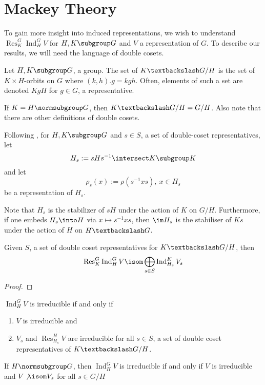 \documentclass[11pt,leqno,oneside]{amsbook}
\newcommand{\Res}{\operatorname{Res}}
\newcommand{\Ind}{\operatorname{Ind}}
\newcommand{\bs}{\textbackslash}
\numberwithin{thm}{section}
\begin{document}
\section{Mackey Theory}
To gain more insight into induced representations, we wish to
understand \(\Res_K^G \Ind_H^G V\) for \(H,K \subgroup G\) and \(V\) a
representation of \(G\). To describe our results, we will need the
language of double cosets.
\begin{defn}
  Let \(H,K \subgroup G\), a group. The set of 
  \(K\bs G /H\) is the set of \(K \times H\)-orbits on
  \(G\) where \((k,h).g = kgh\). Often, elements of such a set are
  denoted \(KgH\) for \(g \in G\), a representative.
\end{defn}
\begin{rmk}
  If \(K=H \normsubgroup G\), then \(K \bs G / H = G/H\). Also note
  that there are other definitions of double cosets.
\end{rmk}
\begin{defn}
  Following \cite{serre}, for \(H,K \subgroup G\) and \(s \in S\), a set
  of double-coset representatives, let \[
    H_s := sHs^{-1} \intersect K \subgroup K
  \]
  and let \[
    \rho_s(x) := \rho(s^{-1}xs), \ x \in H_s
  \]
  be a representation of \(H_s\).
\end{defn}
\begin{rmk}
  Note that \(H_s\) is the stabilizer of \(sH\) under the action of
  \(K\) on \(G/H\). Furthermore, if one embeds \(H_s \into H\) via \(x
  \mapsto s^{-1}xs\), then \(\im H_s\) is the stabiliser of \(Ks\)
  under the action of \(H\) on \(H \bs G\).
\end{rmk}
\begin{prop}
  Given \(S\), a set of double coset representatives for \(K \bs G /
  H\), then \[
    \Res_K^G \Ind_H^G V \isom \bigoplus_{s \in S} \Ind_{H_s}^K V_s
  \]
\end{prop}
\begin{proof}
  
\end{proof}
\begin{thm}
  \(\Ind_H^G V\) is irreducible if and only if
  \begin{enumerate}
  \item \(V\) is irreducible and
  \item \(V_s\) and \(\Res_{H_s}^H V\) are irreducible for all \(s \in
    S\), a set of double coset representatives of \(K \bs G / H\).
  \end{enumerate}
\end{thm}
\begin{cor}
  If \(H \normsubgroup G\), then \(\Ind_H^G V\) is irreducible if and
  only if \(V\) is irreducible and \(V \not \isom V_s\) for all \(s \in G/H\)
\end{cor}
\end{document}
